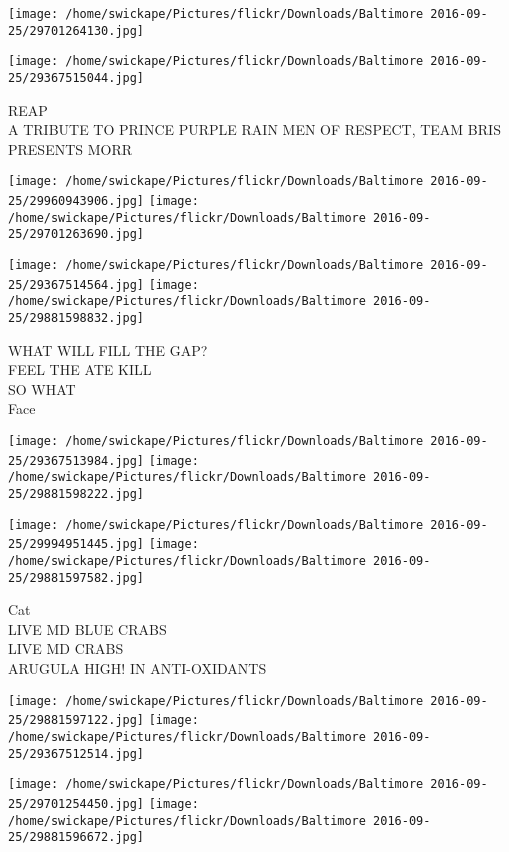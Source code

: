 \documentclass[10pt,letterpaper]{article}
\begin{document}
\texttt{[image: /home/swickape/Pictures/flickr/Downloads/Baltimore 2016-09-25/29701264130.jpg]}

\vspace{0.25in}
\texttt{[image: /home/swickape/Pictures/flickr/Downloads/Baltimore 2016-09-25/29367515044.jpg]}

REAP\\
A TRIBUTE TO PRINCE PURPLE RAIN MEN OF RESPECT, TEAM BRIS PRESENTS MORR
\pagebreak

\texttt{[image: /home/swickape/Pictures/flickr/Downloads/Baltimore 2016-09-25/29960943906.jpg]}
\texttt{[image: /home/swickape/Pictures/flickr/Downloads/Baltimore 2016-09-25/29701263690.jpg]}

\texttt{[image: /home/swickape/Pictures/flickr/Downloads/Baltimore 2016-09-25/29367514564.jpg]}
\texttt{[image: /home/swickape/Pictures/flickr/Downloads/Baltimore 2016-09-25/29881598832.jpg]}

WHAT WILL FILL THE GAP?\\
FEEL THE ATE KILL\\
SO WHAT\\
Face
\pagebreak

\texttt{[image: /home/swickape/Pictures/flickr/Downloads/Baltimore 2016-09-25/29367513984.jpg]}
\texttt{[image: /home/swickape/Pictures/flickr/Downloads/Baltimore 2016-09-25/29881598222.jpg]}

\texttt{[image: /home/swickape/Pictures/flickr/Downloads/Baltimore 2016-09-25/29994951445.jpg]}
\texttt{[image: /home/swickape/Pictures/flickr/Downloads/Baltimore 2016-09-25/29881597582.jpg]}

Cat\\
LIVE MD BLUE CRABS\\
LIVE MD CRABS\\
ARUGULA HIGH! IN ANTI{-}OXIDANTS
\pagebreak

\texttt{[image: /home/swickape/Pictures/flickr/Downloads/Baltimore 2016-09-25/29881597122.jpg]}
\texttt{[image: /home/swickape/Pictures/flickr/Downloads/Baltimore 2016-09-25/29367512514.jpg]}

\texttt{[image: /home/swickape/Pictures/flickr/Downloads/Baltimore 2016-09-25/29701254450.jpg]}
\texttt{[image: /home/swickape/Pictures/flickr/Downloads/Baltimore 2016-09-25/29881596672.jpg]}
\end{document}
